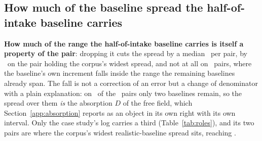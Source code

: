 \subsection{How much of the baseline spread the half-of-intake baseline carries}
\label{app:spread}


\textbf{How much of the range the half-of-intake baseline
carries is itself a property of the pair}: dropping it cuts the spread by a
median \spreadFallMedianPct\ per pair, by \spreadFallWidestPct\ on the pair
holding the corpus's widest spread, and not at all on \nPairsSpreadUnmoved\
pairs, where the baseline's own increment falls inside the range the remaining
baselines already span. The fall is not a correction of an error but
a change of denominator with a plain explanation: on
\nPairsTwoRealisticRungs\ of the \nPairs\ pairs only two baselines remain, so the
spread over them \emph{is} the absorption $D$ of the free field, which
Section~\ref{app:absorption} reports as an object in its own right with its
own interval. Only the case study's log carries a third
(Table~\ref{tab:roles}), and its two pairs are where the corpus's widest
realistic-baseline spread sits, reaching \spreadRealisticMax.
